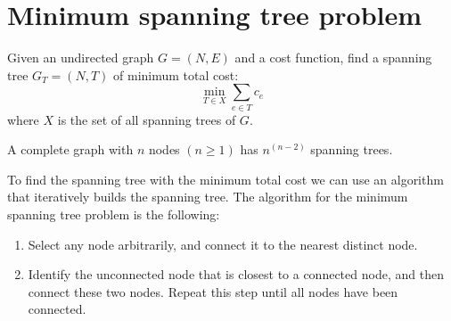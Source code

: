 \documentclass[12pt, a4paper]{report}
\newtheorem[style=M,bodystyle=\normalfont]{theorem}{Theorem}
\newtheorem[style=M,bodystyle=\normalfont]{corollary}{Corollary}
\newtheorem[style=M,bodystyle=\normalfont]{lemma}{Lemma}
\newtheorem[style=M,bodystyle=\normalfont]{definition}{Definition}
\begin{document}
    \section{Minimum spanning tree problem}
    Given an undirected graph $G=(N,E)$ and a cost function, find a spanning tree $G_T=(N,T)$ of minimum total cost: 
    \[\min_{T \in X} \sum_{e \in T}c_e\]
    where $X$ is the set of all spanning trees of $G$. 
    \begin{theorem}[Cayley]
        A complete graph with $n$ nodes $(n \geq 1)$ has $n^{(n-2)}$ spanning trees. 
    \end{theorem}
    To find the spanning tree with the minimum total cost we can use an algorithm that iteratively builds the spanning tree. The algorithm for the minimum spanning tree problem
    is the following: 
    \begin{enumerate}
        \item Select any node arbitrarily, and connect it to the nearest distinct node.
        \item Identify the unconnected node that is closest to a connected node, and then connect these two nodes. Repeat this step until all nodes have been connected.
    \end{enumerate}
\end{document}
